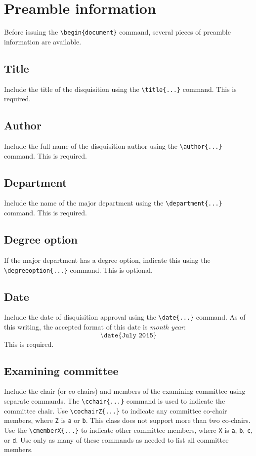 \documentclass{article}
\begin{document}
\section{Preamble information}
Before issuing the \texttt{\textbackslash begin\{document\}} command, several pieces of preamble information are available.
\subsection{Title}
Include the title of the disquisition using the \texttt{\textbackslash title\{...\}} command. This is required.

\subsection{Author}
Include the full name of the disquisition author using the \texttt{\textbackslash author\{...\}} command. This is required.

\subsection{Department}
Include the name of the major department using the \texttt{\textbackslash department\{...\}} command. This is required.

\subsection{Degree option}
If the major department has a degree option, indicate this using the \texttt{\textbackslash degreeoption\{...\}} command. This is optional.

\subsection{Date}
Include the date of disquisition approval using the \texttt{\textbackslash date\{...\}} command. As of this writing, the accepted format of this date is \textit{month year}: $$\texttt{\textbackslash date\{July 2015\}}$$ This is required.

\subsection{Examining committee}
Include the chair (or co-chairs) and members of the examining committee using separate commands. The \texttt{\textbackslash cchair\{...\}} command is used to indicate the committee chair. Use \texttt{\textbackslash cochairZ\{...\}} to indicate any committee co-chair members, where \texttt{Z} is \texttt{a} or \texttt{b}. This class does not support more than two co-chairs. Use the \texttt{\textbackslash cmemberX\{...\}} to indicate other committee members, where \texttt{X} is \texttt{a}, \texttt{b}, \texttt{c}, or \texttt{d}. Use only as many of these commands as needed to list all committee members.
\end{document}
